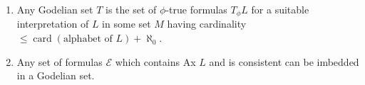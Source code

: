 \begin{enumerate}
\item[(a)] Any Godelian set $T$ is the set of $\phi$-true formulas $T_\phi L$ for a suitable interpretation of $L$ in some set $M$ having cardinality $\leqslant \operatorname{card}(\text{alphabet of } L) + \aleph_0$.
\item[(b)] Any set of formulas $\mathcal{E}$ which contains Ax $L$ and is consistent can be imbedded in a Godelian set.
\end{enumerate}
